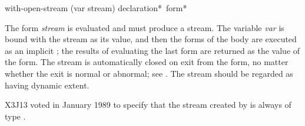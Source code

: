 \begin{defmac}
with-open-stream (var stream) {declaration}* {\,form}*

The form \emph{stream} is evaluated and must produce a stream.
The variable \emph{var} is bound with the stream as its value,
and then the forms of the body are executed
as an implicit ; the results of evaluating
the last form are returned as the value of the  form.
The stream
is automatically closed on exit from the  form,
no matter whether the exit is normal or abnormal;
see .
The stream should be regarded as having dynamic extent.
\begin{new}
X3J13 voted in January 1989
to specify that the stream created by
 is always of type .
\end{new}
\end{defmac}

